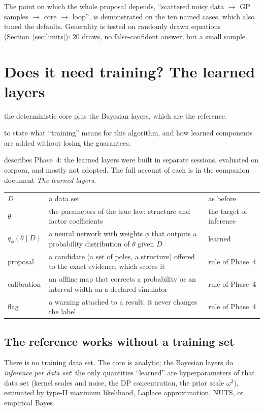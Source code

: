 \documentclass[11pt,a4paper]{article}
\theoremstyle{definition}
\newcommand{\sectionbrief}[3]{\begin{leadin}\begin{description}[nosep,leftmargin=3.0cm,labelwidth=2.8cm]
  \item[Starting from] #1
  \item[Why this section] #2
  \item[Role in the paper] #3
  \end{description}\end{leadin}}
\begin{document}
\begin{keypoint}
The point on which the whole proposal depends, ``scattered noisy data $\to$ GP samples $\to$ core $\to$ loop'', is demonstrated on the ten named cases, which also tuned the defaults. Generality is tested on randomly drawn equations (Section~\ref{sec:limits}): $20$ draws, no false-confident answer, but a small sample.
\end{keypoint}



\section{Does it need training? The learned layers}\label{sec:train}
\sectionbrief
{the deterministic core plus the Bayesian layers, which are the reference.}
{to state what ``training'' means for this algorithm, and how learned components are added without losing the guarantees.}
{describes Phase~4: the learned layers were built in separate sessions, evaluated on corpora, and mostly not adopted. The full account of each is in the companion document \emph{The learned layers}.}

\begin{symbols}
\begin{tabular}{@{}L{2.6cm}L{6.0cm}L{4.3cm}@{}}
$D$ & a data set & as before\\
$\theta$ & the parameters of the true law: structure and factor coefficients & the target of inference\\
$q_\phi(\theta\mid D)$ & a neural network with weights $\phi$ that outputs a probability distribution of $\theta$ given $D$ & learned\\
proposal & a candidate (a set of poles, a structure) offered to the exact evidence, which scores it & rule of Phase~4\\
calibration & an offline map that corrects a probability or an interval width on a declared simulator & rule of Phase~4\\
flag & a warning attached to a result; it never changes the label & rule of Phase~4\\
\end{tabular}
\end{symbols}

\subsection{The reference works without a training set}
There is no training data set. The core is analytic; the Bayesian layers do \emph{inference per data set}: the only quantities ``learned'' are hyperparameters of that data set (kernel scales and noise, the DP concentration, the prior scale $\omega^2$), estimated by type-II maximum likelihood, Laplace approximation, NUTS, or empirical Bayes.
\end{document}
